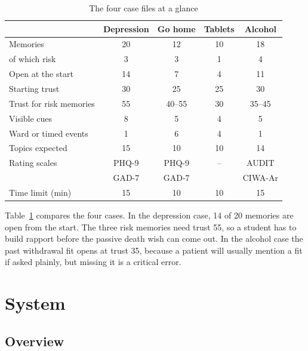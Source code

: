 \documentclass[journal]{IEEEtran}
\begin{document}
\begin{table}[t]
\caption{The four case files at a glance}
\label{tab:casestats}
\centering
\scriptsize
\setlength{\tabcolsep}{2.5pt}
\begin{tabular}{@{}lcccc@{}}
\toprule
& Depression & Go home & Tablets & Alcohol\\
\midrule
Memories & 20 & 12 & 10 & 18\\
\quad of which risk & 3 & 3 & 1 & 4\\
Open at the start & 14 & 7 & 4 & 11\\
Starting trust & 30 & 25 & 25 & 30\\
Trust for risk memories & 55 & 40--55 & 30 & 35--45\\
Visible cues & 8 & 5 & 4 & 5\\
Ward or timed events & 1 & 6 & 4 & 1\\
Topics expected & 15 & 10 & 10 & 14\\
Rating scales & PHQ-9 & PHQ-9 & -- & AUDIT\\
& GAD-7 & GAD-7 & & CIWA-Ar\\
Time limit (min) & 15 & 10 & 10 & 15\\
\bottomrule
\end{tabular}
\end{table}

Table~\ref{tab:casestats} compares the four cases. In the depression case, 14 of 20 memories are open from the start. The three risk memories need trust 55, so a student has to build rapport before the passive death wish can come out. In the alcohol case the past withdrawal fit opens
at trust 35, because a patient will usually mention a fit if asked plainly, but missing it is a critical error.

\section{System}
\subsection{Overview}
\end{document}
